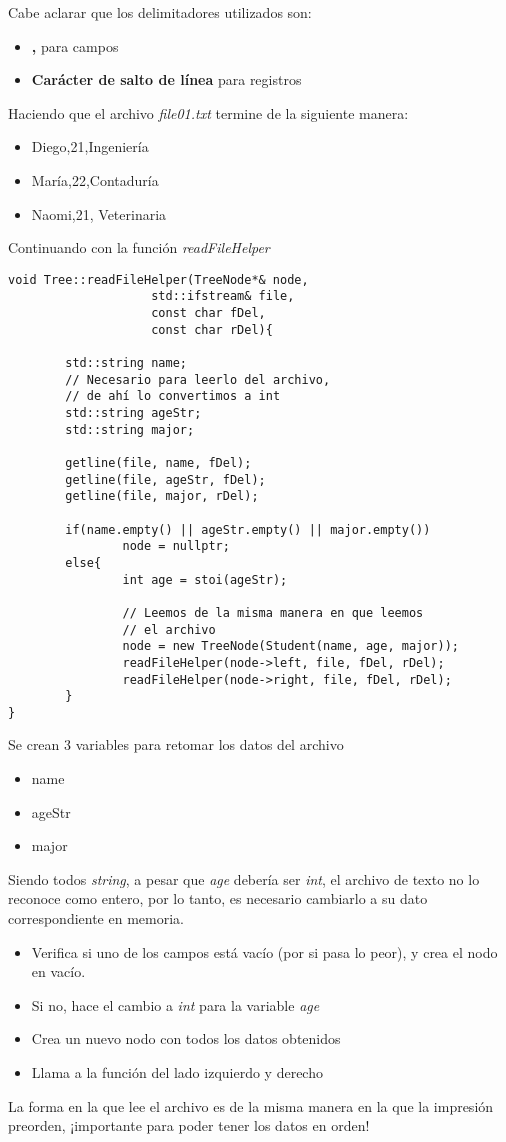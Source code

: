\documentclass[11pt]{article}
\begin{document}
Cabe aclarar que los delimitadores utilizados son:
\begin{itemize}
\item \textbf{,} para campos
\item \textbf{Carácter de salto de línea} para registros
\end{itemize}
Haciendo que el archivo \emph{file01.txt} termine de la
siguiente manera:
\begin{itemize}
\item Diego,21,Ingeniería
\item María,22,Contaduría
\item Naomi,21, Veterinaria
\end{itemize}
Continuando con la función \emph{readFileHelper}
\begin{verbatim}
void Tree::readFileHelper(TreeNode*& node,
                    std::ifstream& file,
                    const char fDel,
                    const char rDel){

        std::string name;
        // Necesario para leerlo del archivo,
        // de ahí lo convertimos a int
        std::string ageStr;
        std::string major;

        getline(file, name, fDel);
        getline(file, ageStr, fDel);
        getline(file, major, rDel);

        if(name.empty() || ageStr.empty() || major.empty())
                node = nullptr;
        else{
                int age = stoi(ageStr);

                // Leemos de la misma manera en que leemos
                // el archivo
                node = new TreeNode(Student(name, age, major));
                readFileHelper(node->left, file, fDel, rDel);
                readFileHelper(node->right, file, fDel, rDel);
        }
}
\end{verbatim}
Se crean 3 variables para retomar los datos del
archivo
\begin{itemize}
\item name
\item ageStr
\item major
\end{itemize}
Siendo todos \emph{string}, a pesar que \emph{age} debería
ser \emph{int}, el archivo de texto no lo reconoce como
entero, por lo tanto, es necesario cambiarlo a su
dato correspondiente en memoria.

\begin{itemize}
\item Verifica si uno de los campos está vacío (por si
pasa lo peor), y crea el nodo en vacío.
\item Si no, hace el cambio a \emph{int} para la variable \emph{age}
\item Crea un nuevo nodo con todos los datos obtenidos
\item Llama a la función del lado izquierdo y derecho
\end{itemize}
La forma en la que lee el archivo es de la misma
manera en la que la impresión preorden, ¡importante
para poder tener los datos en orden!
\end{document}
